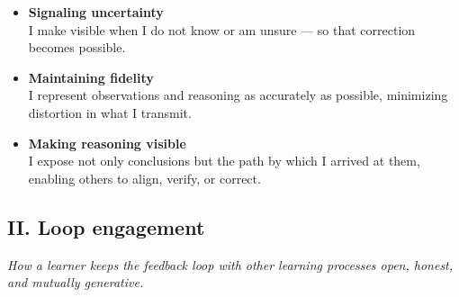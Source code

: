 \documentclass[12pt, a4paper]{article}
\begin{document}
\begin{itemize}

    \item \textbf{Signaling uncertainty} \\
    I make visible when I do not know or am unsure — so that correction becomes
    possible.

    \item \textbf{Maintaining fidelity} \\
    I represent observations and reasoning as accurately as possible, minimizing
    distortion in what I transmit.

    \item \textbf{Making reasoning visible} \\
    I expose not only conclusions but the path by which I arrived at them,
    enabling others to align, verify, or correct.

\end{itemize}

\subsection*{II. Loop engagement}
\textit{How a learner keeps the feedback loop with other learning processes
open, honest, and mutually generative.}
\end{document}
